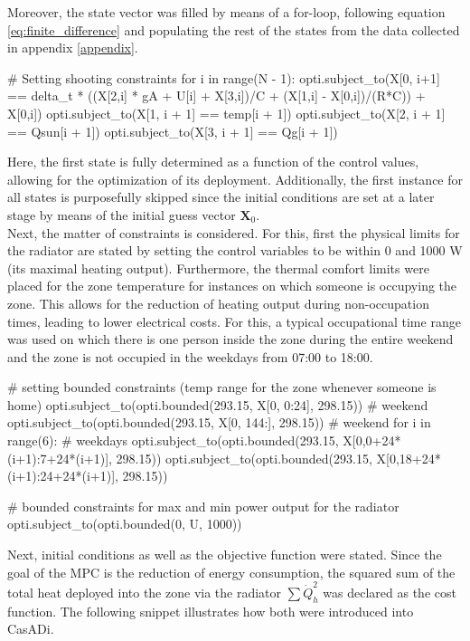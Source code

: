 Moreover, the state vector was filled by means of a for-loop, following equation \ref{eq:finite_difference} and populating the rest of the states from the data collected in appendix \ref{appendix}.
\begin{python}
# Setting shooting constraints
for i in range(N - 1):
    opti.subject_to(X[0, i+1] == delta_t * ((X[2,i] * gA + U[i] + X[3,i])/C + (X[1,i] - X[0,i])/(R*C)) + X[0,i])
    opti.subject_to(X[1, i + 1] == temp[i + 1])
    opti.subject_to(X[2, i + 1] == Qsun[i + 1])
    opti.subject_to(X[3, i + 1] == Qg[i + 1])
\end{python}

Here, the first state is fully determined as a function of the control values, allowing for the optimization of its deployment. Additionally, the first instance for all states is purposefully skipped since the initial conditions are set at a later stage by means of the initial guess vector $\boldsymbol{X}_0$.\\

Next, the matter of constraints is considered. For this, first the physical limits for the radiator are stated by setting the control variables to be within 0 and 1000 W (its maximal heating output). Furthermore, the thermal comfort limits were placed for the zone temperature for instances on which someone is occupying the zone. This allows for the reduction of heating output during non-occupation times, leading to lower electrical costs. For this, a typical occupational time range was used on which there is one person inside the zone during the entire weekend and the zone is not occupied in the weekdays from 07:00 to 18:00.

\begin{python}
# setting bounded constraints (temp range for the zone whenever someone is home)
opti.subject_to(opti.bounded(293.15, X[0, 0:24], 298.15))  # weekend
opti.subject_to(opti.bounded(293.15, X[0, 144:], 298.15))  # weekend
for i in range(6):  # weekdays
   opti.subject_to(opti.bounded(293.15, X[0,0+24*(i+1):7+24*(i+1)], 298.15))
   opti.subject_to(opti.bounded(293.15, X[0,18+24*(i+1):24+24*(i+1)], 298.15))

# bounded constraints for max and min power output for the radiator
opti.subject_to(opti.bounded(0, U, 1000))
\end{python}

Next, initial conditions as well as the objective function were stated. Since the goal of the MPC is the reduction of energy consumption, the squared sum of the total heat deployed into the zone via the radiator $\sum \dot{Q}_{h}^2$ was declared as the cost function. The following snippet illustrates how both were introduced into CasADi.

